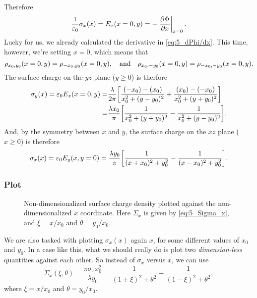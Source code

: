 \documentclass[11pt,letter, swedish, english
]{article}
\newcommand{\enaught}{\ensuremath\varepsilon_0}
\begin{document}
Therefore
\begin{equation}
\frac{1}{\enaught}\sigma_x(x)=E_x(x=0, y)=-\eval{\pdv{\Phi}{x}}_{x=0}.
\end{equation}
Lucky for us, we already calculated the derivative in
\eqref{eq:5_dPhi/dx}. This time, however, we're setting $x=0$, which
means that
\begin{equation}
\rho_{x_0,y_0}(x=0, y)=\rho_{-x_0,y_0}(x=0, y)
\qcomma\text{and}\quad
\rho_{x_0,-y_0}(x=0, y)=\rho_{-x_0,-y_0}(x=0, y).
\end{equation}
The surface charge on the $yz$ plane ($y\ge0$) is therfore
\begin{equation}
\begin{aligned}
\sigma_y(x)=\enaught E_x(x=0, y)=&
\frac{\lambda}{2\pi}
\qty[
\frac{(-x_0)-(x_0)}{x_0^2+(y-y_0)^2}
+\frac{(x_0)-(-x_0)}{x_0^2+(y+y_0)^2}]\\
=&\frac{\lambda x_0}{\pi}
\qty[ \frac{1}{x_0^2+(y+y_0)^2}
-\frac{1}{x_0^2+(y-y_0)^2}].
\end{aligned}
\end{equation}
And, by the symmetry between $x$ and $y$, the surface charge on the
$xz$ plane ($x\ge0$) is therefore
\begin{equation}
\sigma_x(x)=\enaught E_y(x, y=0)=
\frac{\lambda y_0}{\pi}
\qty[
\frac{1}{(x+x_0)^2+y_0^2}
-\frac{1}{(x-x_0)^2+y_0^2}].
\end{equation}

\subsubsection{Plot}
\begin{figure}\centering

\caption{Non-dimensionalized surface charge density plotted against
  the non-dimensionalized $x$ coordinate. Here $\Sigma_x$ is given by
  \eqref{eq:5_Sigma_x}, and $\xi=x/x_0$ and $\theta=y_0/x_0$.}
\label{fig:5_sigma}
\end{figure}
We are also tasked with plotting $\sigma_x(x)$ again $x$, for some
different values of $x_0$ and $y_0$. In a case like this, what we
should really do is plot two \emph{dimension-less} quantities against
each other. So instead of $\sigma_x$ versus $x$, we can use
\begin{equation}\label{eq:5_Sigma_x}
\Sigma_x(\xi, \theta)=\frac{\pi \sigma_x x_0^2}{\lambda y_0}
=\frac{1}{(1+\xi)^2+\theta^2}-\frac{1}{(1-\xi)^2+\theta^2},
\end{equation}
where $\xi=x/x_0$ and $\theta=y_0/x_0$.
\end{document}
